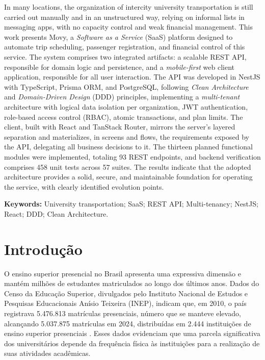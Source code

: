 \documentclass[12pt,openright,oneside,a4paper]{article}
\begin{document}
In many locations, the organization of intercity university transportation is still carried out manually and in an unstructured way, relying on informal lists in messaging apps, with no capacity control and weak financial management. This work presents Movy, a \textit{Software as a Service} (SaaS) platform designed to automate trip scheduling, passenger registration, and financial control of this service. The system comprises two integrated artifacts: a scalable REST API, responsible for domain logic and persistence, and a \textit{mobile-first} web client application, responsible for all user interaction. The API was developed in NestJS with TypeScript, Prisma ORM, and PostgreSQL, following \textit{Clean Architecture} and \textit{Domain-Driven Design} (DDD) principles, implementing a \textit{multi-tenant} architecture with logical data isolation per organization, JWT authentication, role-based access control (RBAC), atomic transactions, and plan limits. The client, built with React and TanStack Router, mirrors the server's layered separation and materializes, in screens and flows, the requirements exposed by the API, delegating all business decisions to it. The thirteen planned functional modules were implemented, totaling 93 REST endpoints, and backend verification comprises 458 unit tests across 57 suites. The results indicate that the adopted architecture provides a solid, secure, and maintainable foundation for operating the service, with clearly identified evolution points.

\textbf{Keywords:} University transportation; SaaS; REST API; Multi-tenancy; NestJS; React; DDD; Clean Architecture.

\newpage
\tableofcontents
\newpage

\section{Introdução}
\label{sec:introducao}
O ensino superior presencial no Brasil apresenta uma expressiva dimensão e mantém milhões de estudantes matriculados ao longo dos últimos anos. Dados do Censo da Educação Superior, divulgados pelo Instituto Nacional de Estudos e Pesquisas Educacionais Anísio Teixeira (INEP), indicam que, em 2010, o país registrava 5.476.813 matrículas presenciais, número que se manteve elevado, alcançando 5.037.875 matrículas em 2024, distribuídas em 2.444 instituições de ensino superior presenciais \cite{inepCensoSuperior}. Esses dados evidenciam que uma parcela significativa dos universitários depende da frequência física às instituições para a realização de suas atividades acadêmicas.
\end{document}
